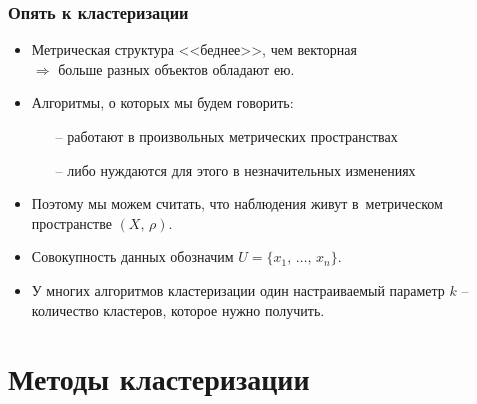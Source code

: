 \documentclass[unicode]{beamer}
\begin{document}
\begin{frame}[t]
{\begin{center}
\end{center}
}

\end{frame}

\begin{frame}[t]
\frametitle{Опять к кластеризации}

\begin{itemize}
\item Метрическая структура <<беднее>>, чем векторная\\
  $\Rightarrow$ больше разных объектов обладают ею.
\item Алгоритмы, о которых мы будем говорить:
  \begin{itemize}
  \item[--] работают в произвольных метрических пространствах
  \item[--] либо нуждаются для этого в незначительных изменениях
  \end{itemize}
\item Поэтому мы можем считать, что наблюдения живут в~метрическом пространстве $(X,\, \rho)$.
\item Совокупность данных обозначим $U = \{x_1,\, \dots,\, x_n\}$.
\item У многих алгоритмов кластеризации один настраиваемый параметр $k$ -- количество кластеров, которое нужно получить.
\end{itemize}

\end{frame}

\section{Методы кластеризации}
\end{document}
